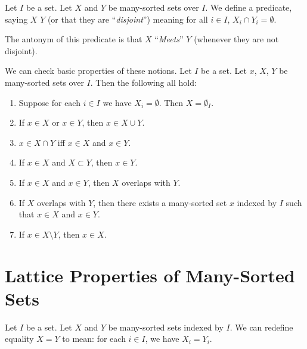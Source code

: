 \begin{definition}
Let $I$ be a set.
Let $X$ and $Y$ be many-sorted sets over $I$.
We define a predicate, saying $X$  $Y$ (or that they
are ``\emph{disjoint\/}'') meaning
for all $i\in I$, $X_{i}\cap Y_{i}=\emptyset$.

The antonym of this predicate is that $X$ ``\emph{Meets\/}'' $Y$
(whenever they are not disjoint).
\end{definition}

\begin{theorem}
We can check basic properties of these notions.
Let $I$ be a set. Let $x$, $X$, $Y$ be many-sorted sets over $I$. Then
the following all hold:
\begin{enumerate}
\item{} Suppose for each $i\in I$ we have $X_{i}=\emptyset$. Then $X=\emptyset_{I}$.
\item{} If $x\in X$ or $x\in Y$, then $x\in X\cup Y$.
\item{} $x\in X\cap Y$ iff $x\in X$ and $x\in Y$.
\item{} If $x\in X$ and $X\subset Y$, then $x\in Y$.
\item{} If $x\in X$ and $x\in Y$, then $X$ overlaps with $Y$.
\item{} If $X$ overlaps with $Y$, then there exists a
  many-sorted set $x$ indexed by $I$ such that $x\in X$ and $x\in Y$.
\item{} If $x\in X\setminus Y$, then $x\in X$.
\end{enumerate}
\end{theorem}

\section{Lattice Properties of Many-Sorted Sets}

\begin{definition}
Let $I$ be a set.
Let $X$ and $Y$ be many-sorted sets indexed by $I$.
We can redefine equality $X=Y$ to mean: for each $i\in I$, we have $X_{i}=Y_{i}$.
\end{definition}

